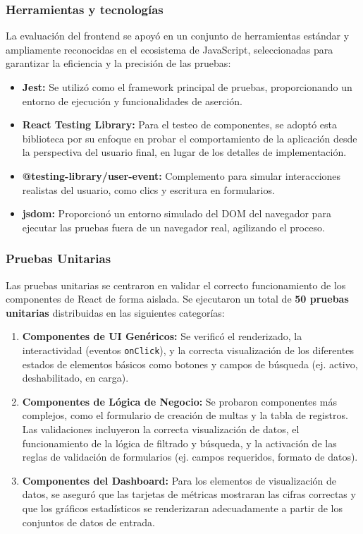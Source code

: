 \subsubsection{Herramientas y tecnologías}

La evaluación del frontend se apoyó en un conjunto de herramientas estándar y ampliamente reconocidas en el ecosistema de JavaScript, seleccionadas para garantizar la eficiencia y la precisión de las pruebas:

\begin{itemize}
    \item \textbf{Jest:} Se utilizó como el framework principal de pruebas, proporcionando un entorno de ejecución y funcionalidades de aserción.
    \item \textbf{React Testing Library:} Para el testeo de componentes, se adoptó esta biblioteca por su enfoque en probar el comportamiento de la aplicación desde la perspectiva del usuario final, en lugar de los detalles de implementación.
    \item \textbf{@testing-library/user-event:} Complemento para simular interacciones realistas del usuario, como clics y escritura en formularios.
    \item \textbf{jsdom:} Proporcionó un entorno simulado del DOM del navegador para ejecutar las pruebas fuera de un navegador real, agilizando el proceso.
\end{itemize}

\subsubsection{Pruebas Unitarias}

Las pruebas unitarias se centraron en validar el correcto funcionamiento de los componentes de React de forma aislada. Se ejecutaron un total de \textbf{50 pruebas unitarias} distribuidas en las siguientes categorías:

\begin{enumerate}
    \item \textbf{Componentes de UI Genéricos:} Se verificó el renderizado, la interactividad (eventos \texttt{onClick}), y la correcta visualización de los diferentes estados de elementos básicos como botones y campos de búsqueda (ej. activo, deshabilitado, en carga).
    
    \item \textbf{Componentes de Lógica de Negocio:} Se probaron componentes más complejos, como el formulario de creación de multas y la tabla de registros. Las validaciones incluyeron la correcta visualización de datos, el funcionamiento de la lógica de filtrado y búsqueda, y la activación de las reglas de validación de formularios (ej. campos requeridos, formato de datos).
    
    \item \textbf{Componentes del Dashboard:} Para los elementos de visualización de datos, se aseguró que las tarjetas de métricas mostraran las cifras correctas y que los gráficos estadísticos se renderizaran adecuadamente a partir de los conjuntos de datos de entrada.
\end{enumerate}


